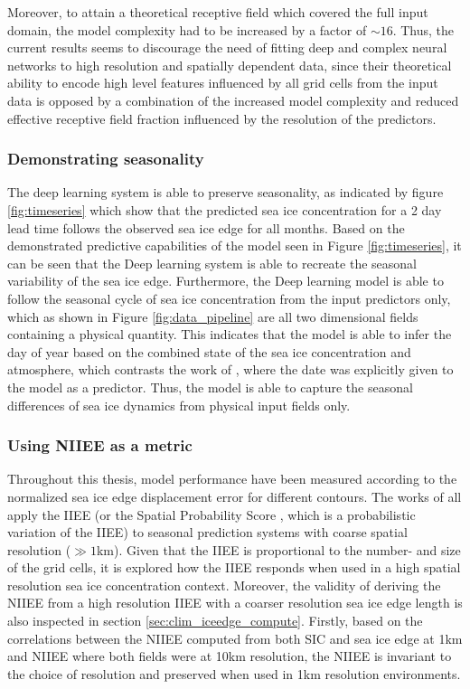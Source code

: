 \documentclass[../main/thesis]{subfiles}
\begin{document}
Moreover, to attain a theoretical receptive field which covered the full input domain, the model complexity had to be increased by a factor of $\sim 16$. Thus, the current results seems to discourage the need of fitting deep and complex neural networks to high resolution and spatially dependent data, since their theoretical ability to encode high level features influenced by all grid cells from the input data is opposed by a combination of the increased model complexity and reduced effective receptive field fraction influenced by the resolution of the predictors.

\subsubsection{Demonstrating seasonality}
\label{sec:demonstrate_seasonality}
The deep learning system is able to preserve seasonality, as indicated by figure \ref{fig:timeseries} which show that the predicted sea ice concentration for a 2 day lead time follows the observed sea ice edge for all months. Based on the demonstrated predictive capabilities of the model seen in Figure \ref{fig:timeseries}, it can be seen that the Deep learning system is able to recreate the seasonal variability of the sea ice edge. Furthermore, the Deep learning model is able to follow the seasonal cycle of sea ice concentration from the input predictors only, which as shown in Figure \ref{fig:data_pipeline} are all two dimensional fields containing a physical quantity. This indicates that the model is able to infer the day of year based on the combined state of the sea ice concentration and atmosphere, which contrasts the work of \citet{Grigoryev2022}, where the date was explicitly given to the model as a predictor. Thus, the model is able to capture the seasonal differences of sea ice dynamics from physical input fields only.

\subsubsection{Using NIIEE as a metric}
Throughout this thesis, model performance have been measured according to the normalized sea ice edge displacement error \citep{Goessling2016, Melsom2019, Palerme2019, Zampieri2019} for different contours. The works of \citet{Goessling2016, Palerme2019, Zampieri2019} all apply the IIEE (or the Spatial Probability Score \citep{Goessling2018}, which is a probabilistic variation of the IIEE) to seasonal prediction systems with coarse spatial resolution ($\gg1$km). Given that the IIEE is proportional to the number- and size of the grid cells, it is explored how the IIEE responds when used in a high spatial resolution sea ice concentration context. Moreover, the validity of deriving the NIIEE from a high resolution IIEE with a coarser resolution sea ice edge length is also inspected in section \ref{sec:clim_iceedge_compute}. Firstly, based on the correlations between the NIIEE computed from both SIC and sea ice edge at 1km and NIIEE where both fields were at 10km resolution, the NIIEE is invariant to the choice of resolution and preserved when used in 1km resolution environments.
\end{document}
